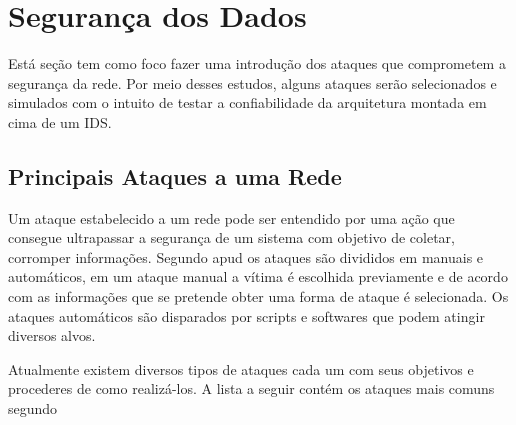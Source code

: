 \chapter{Segurança dos Dados}
\label{chap:Seguranca}

	Está seção tem como foco fazer uma introdução dos ataques que comprometem a segurança da rede. Por meio desses estudos, alguns ataques serão selecionados e simulados com o intuito de testar a confiabilidade da arquitetura montada em cima de um IDS.

	\section{Principais Ataques a uma Rede}
	\label{sec:Seguranca_PA}

		Um ataque estabelecido a um rede pode ser entendido por uma ação que consegue ultrapassar a segurança de um sistema com objetivo de coletar, corromper informações. Segundo \cite{Verissimo} apud \cite{Morais} os ataques são divididos em manuais e automáticos, em um ataque manual a vítima é escolhida previamente e de acordo com as informações que se pretende obter uma forma de ataque é selecionada. Os ataques automáticos são disparados por scripts e softwares que podem atingir diversos alvos. 


		Atualmente existem diversos tipos de ataques cada um com seus objetivos e procederes de como realizá-los. A lista a seguir contém os ataques mais comuns segundo \cite{Morais}

